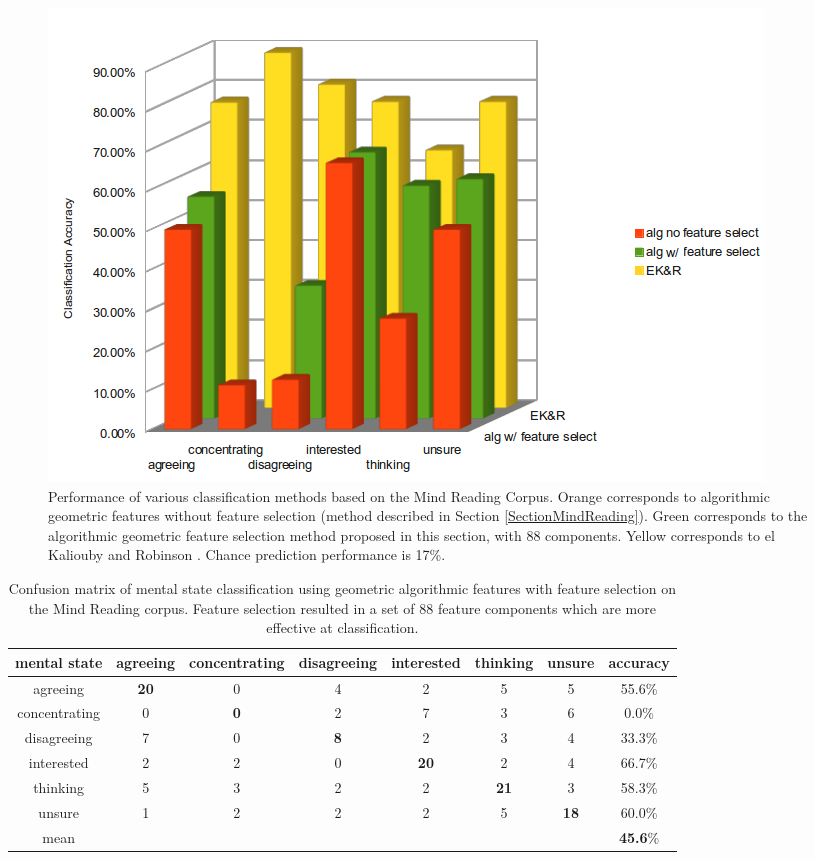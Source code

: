 \begin{figure}
\centering
\includegraphics[width = 0.8 \columnwidth]{featureselection/MindReadingFeatureSelectPerf.png}
\caption[Performance of various classification methods based on the Mind Reading Corpus.]{Performance of various classification methods based on the Mind Reading Corpus. Orange corresponds to algorithmic geometric features without feature selection (method described in Section \ref{SectionMindReading}). Green corresponds to the algorithmic geometric feature selection method proposed in this section, with 88 components. Yellow corresponds to el Kaliouby and Robinson \cite{ElKaliouby2004}. Chance prediction performance is 17\%.}
\label{FigureMindReadingAlgFs}
\end{figure}

\begin{table}[tb]
\centering
\caption[Confusion matrix of mental state classification using geometric algorithmic features with feature selection on the Mind Reading corpus.]{Confusion matrix of mental state classification using geometric algorithmic features with feature selection on the Mind Reading corpus. Feature selection resulted in a set of 88 feature components which are more effective at classification.}
\scriptsize 
\begin{tabular}{ c || c | c | c | c | c | c || c  }
\hline
mental state&agreeing&concentrating&disagreeing&interested&thinking&unsure&accuracy\\
\hline
agreeing	&\textbf{20}	&0	&4	&2	&5	&5	&55.6\%\\
concentrating	&0	&\textbf{0}	&2	&7	&3	&6	&0.0\%\\
disagreeing	&7	&0	&\textbf{8}	&2	&3	&4	&33.3\%\\
interested	&2	&2	&0	&\textbf{20}	&2	&4	&66.7\%\\
thinking	&5	&3	&2	&2	&\textbf{21}	&3	&58.3\%\\
unsure		&1	&2	&2	&2	&5	&\textbf{18}	&60.0\%\\
mean		&	&	&	&	&	&	&\textbf{45.6}\%\\
\end{tabular}
\normalsize
\label{TableMindReadingAlgFs}
\end{table}

